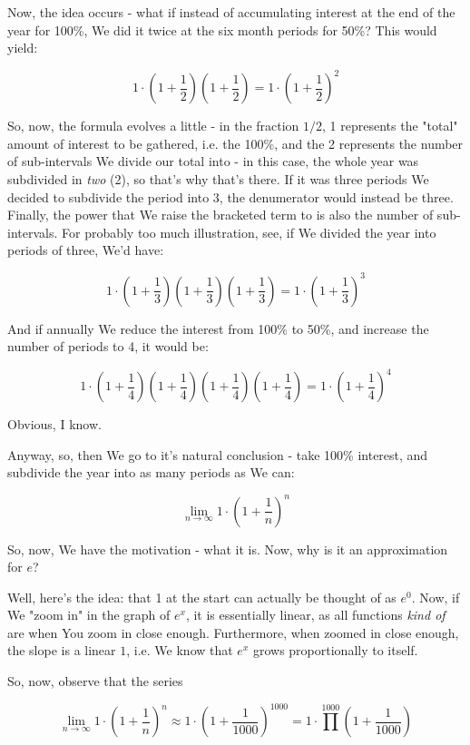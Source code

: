 \documentclass{article}
\begin{document}
		Now, the idea occurs - what if instead of accumulating interest at the end of the year for 100\%, We did it twice at the six month periods for 50\%? This would yield:
		
		\[ 1\cdot\left(1+\frac{1}{2}\right)\left(1+\frac{1}{2}\right) = 1\cdot\left(1+\frac{1}{2}\right)^2 \]
		
		So, now, the formula evolves a little - in the fraction $1/2$, 1 represents the "total" amount of interest to be gathered, i.e. the 100\%, and the 2 represents the number of sub-intervals We divide our total into - in this case, the whole year was subdivided in \textit{two} (2), so that's why that's there. If it was three periods We decided to subdivide the period into 3, the denumerator would instead be three. Finally, the power that We raise the bracketed term to is also the number of sub-intervals. For probably too much illustration, see, if We divided the year into periods of three, We'd have:
		 
		
		\[ 1\cdot\left(1+\frac{1}{3}\right)\left(1+\frac{1}{3}\right)\left(1+\frac{1}{3}\right) = 1\cdot\left(1+\frac{1}{3}\right)^3 \]
		
		And if annually We reduce the interest from 100\% to 50\%, and increase the number of periods to 4, it would be:
		
		\[ 1\cdot\left(1+\frac{1}{4}\right)\left(1+\frac{1}{4}\right)\left(1+\frac{1}{4}\right)\left(1+\frac{1}{4}\right) = 1\cdot\left(1+\frac{1}{4}\right)^4 \]

		Obvious, I know.
		
		Anyway, so, then We go to it's natural conclusion - take 100\% interest, and subdivide the year into as many periods as We can:
		
		\[\lim_{n\to\infty} 1\cdot\left(1+\frac{1}{n}\right)^n \]
		
		So, now, We have the motivation - what it is. Now, why is it an approximation for $e$?
		
		Well, here's the idea: that 1 at the start can actually be thought of as $e^0$. Now, if We "zoom in" in the graph of $e^x$, it is essentially linear, as all functions \textit{kind of} are when You zoom in close enough. Furthermore, when zoomed in close enough, the slope is a linear $1$, i.e. We know that $e^x$ grows proportionally to itself.
		
		So, now, observe that the series  
		
		\[\lim_{n\to\infty} 1\cdot\left(1+\frac{1}{n}\right)^n \approx 1\cdot\left( 1+\frac{1}{1000} \right)^{1000} = 1\cdot \prod^{1000} \left(1+\frac{1}{1000}\right) \]
		
\end{document}
